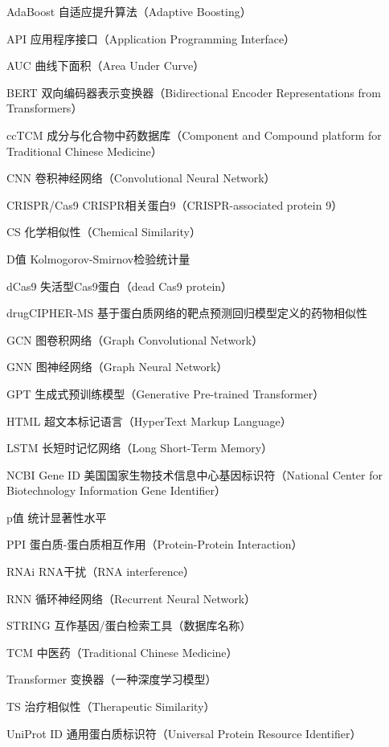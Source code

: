 
\begin{denotation}[3cm]
  \item[AdaBoost]{自适应提升算法（Adaptive Boosting）}
  \item[API]{应用程序接口（Application Programming Interface）}
  \item[AUC]{曲线下面积（Area Under Curve）}
  \item[BERT]{双向编码器表示变换器（Bidirectional Encoder Representations from Transformers）}
  \item[ccTCM]{成分与化合物中药数据库（Component and Compound platform for Traditional Chinese Medicine）}
  \item[CNN]{卷积神经网络（Convolutional Neural Network）}
  \item[CRISPR/Cas9]{CRISPR相关蛋白9（CRISPR-associated protein 9）}
  \item[CS]{化学相似性（Chemical Similarity）}
  \item[D值]{Kolmogorov-Smirnov检验统计量}
  \item[dCas9]{失活型Cas9蛋白（dead Cas9 protein）}
  \item[drugCIPHER-MS]{基于蛋白质网络的靶点预测回归模型定义的药物相似性}
  \item[GCN]{图卷积网络（Graph Convolutional Network）}
  \item[GNN]{图神经网络（Graph Neural Network）}
  \item[GPT]{生成式预训练模型（Generative Pre-trained Transformer）}
  \item[HTML]{超文本标记语言（HyperText Markup Language）}
  \item[LSTM]{长短时记忆网络（Long Short-Term Memory）}
  \item[NCBI Gene ID]{美国国家生物技术信息中心基因标识符（National Center for Biotechnology Information Gene Identifier）}
  \item[p值]{统计显著性水平}
  \item[PPI]{蛋白质-蛋白质相互作用（Protein-Protein Interaction）}
  \item[RNAi]{RNA干扰（RNA interference）}
  \item[RNN]{循环神经网络（Recurrent Neural Network）}
  \item[STRING]{互作基因/蛋白检索工具（数据库名称）}
  \item[TCM]{中医药（Traditional Chinese Medicine）}
  \item[Transformer]{变换器（一种深度学习模型）}
  \item[TS]{治疗相似性（Therapeutic Similarity）}
  \item[UniProt ID]{通用蛋白质标识符（Universal Protein Resource Identifier）}
\end{denotation}


